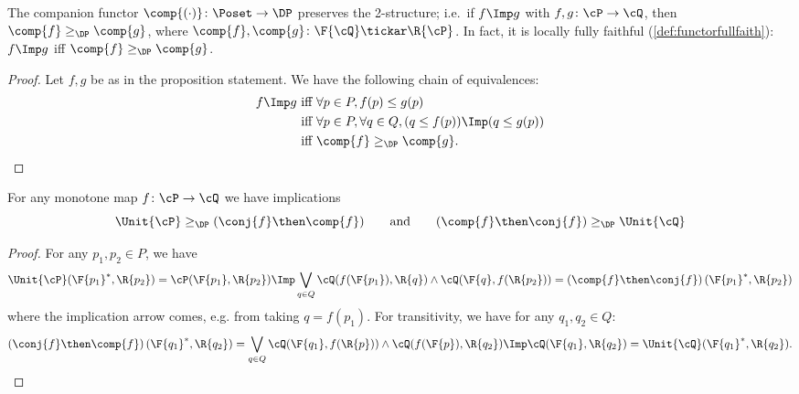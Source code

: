 \begin{example}
\end{example}


\begin{proposition}\label{prop:companion_2}
The companion functor $\comp{(\cdot)}\colon\Poset\to\DP$ preserves the 2-structure; i.e.\ if $f\Imp g$ with $f,g\colon \cP \to\cQ $, then $\comp{f}\geq_\DP\comp{g}$, where $\comp{f},\comp{g}\colon \F{\cQ} \tickar\R{\cP}$. In fact, it is locally fully faithful (\cref{def:functorfullfaith}): $f\Imp g$ iff $\comp{f}\geq_\DP \comp{g}$.
\end{proposition}
\begin{proof}
Let $f,g$ be as in the proposition statement. We have the following chain of equivalences:
\begin{equation}
\begin{aligned}
	f\Imp g&\text{ iff }
	\forall p\in P, f(p)\leq g(p)\\&\text{ iff }
	\forall p\in P, \forall q\in Q, (q\leq f(p))\Imp (q\leq g(p))\\&\text{ iff }
	\comp{f}\geq_\DP \comp{g}.
\end{aligned}
\end{equation}
\end{proof}

\begin{proposition}\label{prop:comp_conj_adj}
For any monotone map $f\colon\cP \to\cQ $ we have implications
\begin{equation}
\Unit{\cP }\geq_\DP (\conj{f}\then \comp{f})
\qquad\text{and}\qquad
(\comp{f}\then \conj{f})\geq_\DP \Unit{\cQ }
\end{equation}
\end{proposition}
\begin{proof}
For any $p_1,p_2\in P$, we have
\begin{equation}
	\Unit{\cP }(\F{p_1}^*,\R{p_2})=\cP (\F{p_1},\R{p_2})
	\Imp\bigvee_{q\in Q}\cQ (f(\F{p_1}),\R{q})\wedge\cQ (\F{q},f(\R{p_2}))=\left(\comp{f}\then \conj{f}\right)(\F{p_1}^*,\R{p_2})
\end{equation}
where the implication arrow comes, e.g. from taking $q=f(p_1)$. For transitivity, we have for any $q_1,q_2\in Q$:
\begin{equation}
	\left(\conj{f}\then \comp{f}\right)(\F{q_1}^*,\R{q_2})=\bigvee_{q\in Q}\cQ (\F{q_1},f(\R{p}))\wedge\cQ (f(\F{p}),\R{q_2})
	\Imp\cQ (\F{q_1},\R{q_2})=\Unit{\cQ }(\F{q_1}^*,\R{q_2}).
\end{equation}
\end{proof}

